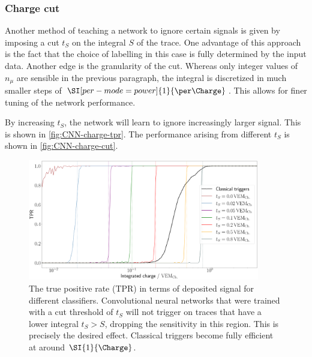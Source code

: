 \subsubsection{Charge cut}
\label{sssec:charge-cut}

Another method of teaching a network to ignore certain signals is given by imposing a cut $t_S$ on the integral $S$ of the trace. One advantage of this approach is
the fact that the choice of labelling in this case is fully determined by the input data. Another edge is the granularity of the cut. Whereas only integer values 
of $n_\mu$ are sensible in the previous paragraph, the integral is discretized in much smaller steps of $\SI[per-mode=power]{1}{\per\Charge}$. This allows for 
finer tuning of the network performance.

By increasing $t_S$, the network will learn to ignore increasingly larger signal. This is shown in \autoref{fig:CNN-charge-tpr}. The performance arising from 
different $t_S$ is shown in \autoref{fig:CNN-charge-cut}.

\begin{figure}
	\centering
	\includegraphics[width=0.9\textwidth]{./plots/CNN_charge_TPR.png}
	\caption{The true positive rate (TPR) in terms of deposited signal for different classifiers. Convolutional neural networks that were trained with a cut 
	threshold of $t_S$ will not trigger on traces that have a lower integral $t_S > S$, dropping the sensitivity in this region. This is precisely the desired 
	effect. Classical triggers become fully efficient at around $\SI{1}{\Charge}$.}
	\label{fig:CNN-charge-tpr}
\end{figure}

